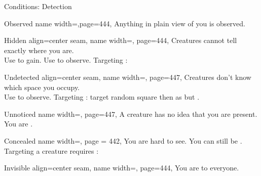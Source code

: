 \begin{PageFrontLandscape}
\begin{TablesHalf}{\frontTableHeight}
\begin{Table}{Conditions: Detection}
            \begin{entry}{Observed}{%
                name width=\conditionLength,page=444,}
                Anything in plain view of you is observed.
            \end{entry}
            \begin{entry}{Hidden}{%
                align=center seam,
                name width=\conditionLength,%
                page=444,
            }%
                Creatures cannot tell exactly where you are. \hfill
                \\
                Use  to gain. Use  to observe. \hfill
                Targeting \Hidden\hspace{0.1ex}: \Flat[][val=11] 
            \end{entry}
            \begin{entry}{Undetected}{%
                align=center seam,
                name width=\conditionLength,%
                page=447,
            }
                Creatures don't know which space you occupy. \hfill {}\\
                Use  to observe.\hfill
                Targeting \Undetected: target random square then as \Hidden but \Se.
            \end{entry}
            \begin{entry}{Unnoticed}{%
                name width=\conditionLength,%
                page=447,
            }
                A creature has no idea that you are present. You are \Undetected.
            \end{entry}
            \breakLine
            \begin{entry}{Concealed}{%
                name width=\conditionLength,%
                page = 442,
            }
                You are hard to see. You can still be \Observed. \hfill
                Targeting a \Concealed creature requires : \Flat[][val=5] 
            \end{entry}
            \begin{entry}{Invisible}{%
                align=center seam,
                name width=\conditionLength,%
                page=444,
            }
                You are \Undetected to everyone. \hfill
                 \\

\end{entry}
\end{Table}
\end{TablesHalf}
\end{PageFrontLandscape}

